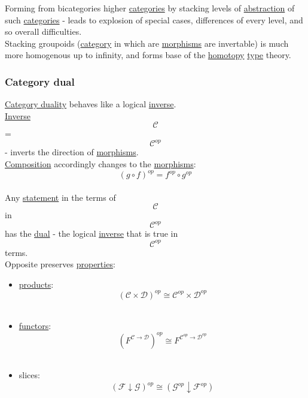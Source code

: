 \documentclass[11pt]{article}
\begin{document}
Forming from bicategories higher \hyperref[org2f49b91]{categories} by stacking levels of \hyperref[org3470ee4]{abstraction} of such \hyperref[org2f49b91]{categories} - leads to explosion of special cases, differences of every level, and so overall difficulties.\\

Stacking groupoids (\hyperref[org0450535]{category} in which are \hyperref[org6c2fa5c]{morphisms} are invertable) is much more homogenous up to infinity, and forms base of the \hyperref[orgb19d3ed]{homotopy} \hyperref[orgc4aea2f]{type} theory.\\

\subsubsection{\label{org7e50355}Category dual}
\label{sec:org0fd835b}
\hyperref[orga78b2f9]{Category duality} behaves like a logical \hyperref[org0da4e7e]{inverse}.\\

\hyperref[org0da4e7e]{Inverse} $$ \mathcal{C} $$ = $$ \mathcal{C}^{op} $$ - inverts the direction of \hyperref[org6c2fa5c]{morphisms}.\\

\hyperref[orga128e7f]{Composition} accordingly changes to the \hyperref[org6c2fa5c]{morphisms}: $$ (g \circ f)^{op} = f^{op} \circ g^{op} $$\\

Any \hyperref[org36313c0]{statement} in the terms of $$ \mathcal{C} $$ in $$ \mathcal{C}^{op} $$ has the \hyperref[org28cefbe]{dual} - the logical \hyperref[org0da4e7e]{inverse} that is true in $$ \mathcal {C}^{op} $$ terms.\\

Opposite preserves \hyperref[org85fb3a1]{properties}:\\
\begin{itemize}
\item \hyperref[orgacb3cee]{products}: $$ (\mathcal{C} \times \mathcal{D})^{op} \cong \mathcal{C}^{op} \times \mathcal{D}^{op} $$\\

\item \hyperref[orgdd21ed6]{functors}: $$ (F^{\mathcal{C} \to \mathcal{D}})^{op} \cong F^{\mathcal{C}^{op} \to \mathcal{D}^{op}} $$\\

\item slices: $$ (\mathcal{F} \downarrow \mathcal{G})^{op} \cong (\mathcal{G}^{op} \downarrow \mathcal{F}^{op}) $$\\
\end{itemize}
\end{document}
